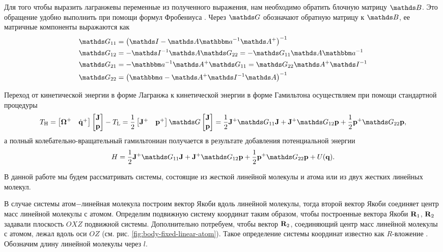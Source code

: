 Для того чтобы выразить лагранжевы переменные из полученного выражения, нам необходимо обратить блочную матрицу $\bbB$. Это обращение удобно выполнить при помощи формул Фробениуса \cite{petrov2015, gantmaher}. Через $\bbG$ обозначают обратную матрицу к $\bbB$, ее матричные компоненты выражаются как
\begin{gather}
    \begin{aligned}
        \bbG_{11} &= \lb \bbI - \bbA \bba^{-1} \bbA^+ \rb^{-1} \\
        \bbG_{12} &= -\bbI^{-1} \bbA \bbG_{22} = -\bbG_{11} \bbA \bba^{-1} \\
        \bbG_{21} &= -\bba^{-1} \bbA^+ \bbG_{11} = \bbG_{22} \bbA^+ \bbI^{-1} \\
        \bbG_{22} &= \lb \bba - \bbA^+ \bbI^{-1} \bbA \rb^{-1}
    \end{aligned} \label{polyatom-frobenius}
\end{gather}

Переход от кинетической энергии в форме Лагранжа к кинетической энергии в форме Гамильтона осуществляем при помощи стандартной процедуры \cite{goldstein}
\begin{gather}
    \Th = \begin{bmatrix} \bOmega^+ & \dot{\mf{q}}^+ \end{bmatrix} \begin{bmatrix} \mf{J} \\ \mf{p} \end{bmatrix} - \Tl = \frac{1}{2} \begin{bmatrix} \mf{J}^+ & \mf{p}^+ \end{bmatrix} \bbG \begin{bmatrix} \mf{J} \\ \mf{p} \end{bmatrix} = \frac{1}{2} \mf{J}^+ \bbG_{11} \mf{J} + \mf{J}^+ \bbG_{12} \mf{p} + \frac{1}{2} \mf{p}^+ \bbG_{22} \mf{p}, \label{general-rovibrational-kin-energy} 
\end{gather}
а полный колебательно-вращательный гамильтониан получается в результате добавления потенциальной энергии
\begin{gather}
    H = \frac{1}{2} \mf{J}^+ \bbG_{11} \mf{J} + \mf{J}^+ \bbG_{12} \mf{p} + \frac{1}{2} \mf{p}^+ \bbG_{22} \mf{p} + U(\mf{q}). \label{general-rovibrational-hamiltonian} 
\end{gather}

В данной работе мы будем рассматривать системы, состоящие из жесткой линейной молекулы и атома или из двух жестких линейных молекул. \par
В случае системы атом$-$линейная молекула построим вектор Якоби вдоль линейной молекулы, тогда второй вектор Якоби соединяет центр масс линейной молекулы с атомом. Определим подвижную систему координат таким образом, чтобы построенные вектора Якоби $\mathbf{R}_1$, $\mathbf{R}_2$ задавали плоскость $OXZ$ подвижной системы. Дополнительно потребуем, чтобы вектор $\mathbf{R}_2$, соединяющий центр масс линейной молекулы с атомом, лежал вдоль оси $OZ$ (см. рис. \ref{fig:body-fixed-linear-atom}). Такое определение системы координат известно как $R$-вложение \cite{tennyson1986}. Обозначим длину линейной молекулы через $l$.
    
